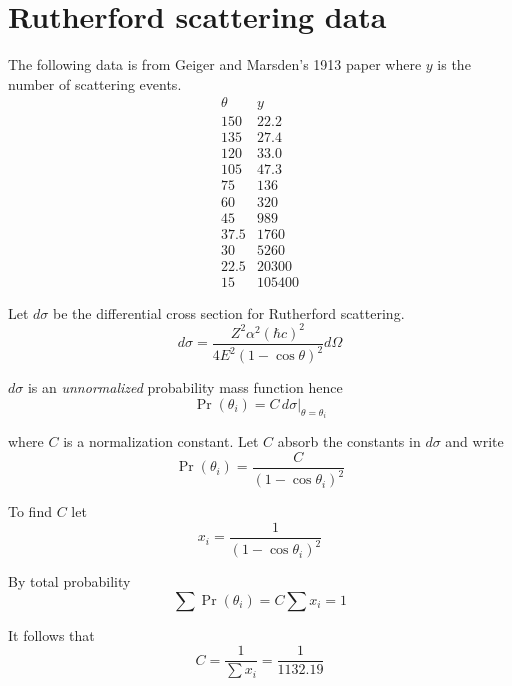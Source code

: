 

\section*{Rutherford scattering data}

The following data is from Geiger and Marsden's 1913 paper
where $y$ is the number of scattering events.
\begin{equation*}
\begin{matrix}
\theta & y\\
150 & 22.2\\
135 & 27.4\\
120 & 33.0\\
105 & 47.3\\
75 & 136\\
60 & 320\\
45 & 989\\
37.5 & 1760\\
30 & 5260\\
22.5 & 20300\\
15 & 105400
\end{matrix}
\end{equation*}

Let $d\sigma$ be the differential cross section for Rutherford scattering.
\begin{equation*}
d\sigma=\frac{Z^2\alpha^2(\hbar c)^2}{4E^2(1-\cos\theta)^2}d\Omega
\end{equation*}

$d\sigma$ is an {\it unnormalized} probability mass function hence
\begin{equation*}
\Pr(\theta_i)=C\,d\sigma\big|_{\theta=\theta_i}
\end{equation*}

where $C$ is a normalization constant.
Let $C$ absorb the constants in $d\sigma$ and write
\begin{equation*}
\Pr(\theta_i)=\frac{C}{(1-\cos\theta_i)^2}
\end{equation*}

To find $C$ let
\begin{equation*}
x_i=\frac{1}{(1-\cos\theta_i)^2}
\end{equation*}

By total probability
\begin{equation*}
\sum\Pr(\theta_i)=C\sum x_i=1
\end{equation*}

It follows that
\begin{equation*}
C=\frac{1}{\sum x_i}=\frac{1}{1132.19}
\end{equation*}

